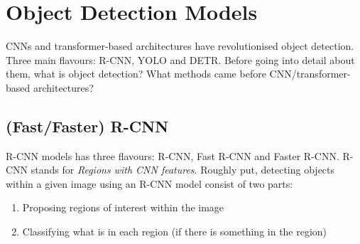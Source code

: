 \documentclass[11pt]{article}
\begin{document}
\section{Object Detection Models}

CNNs and transformer-based architectures have revolutionised object detection. Three main flavours: R-CNN, YOLO and DETR. Before going into detail about them, what is object detection? What methods came before CNN/transformer-based architectures?

\subsection{(Fast/Faster) R-CNN}
R-CNN models has three flavours: R-CNN, Fast R-CNN and Faster R-CNN. R-CNN stands for \textit{Regions with CNN features}. Roughly put, detecting objects within a given image using an R-CNN model consist of two parts:
\begin{enumerate}
    \item Proposing regions of interest within the image
    \item Classifying what is in each region (if there is something in the region)
\end{enumerate}
\end{document}
